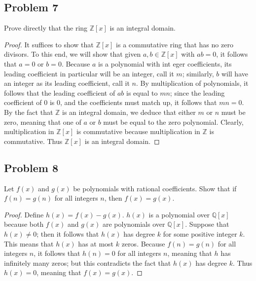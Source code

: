 \documentclass{article}
\begin{document}
\subsection*{Problem 7}
Prove directly that the ring $\mathbb{Z}[x]$ is an integral domain. 
\begin{proof}
	It suffices to show that $\mathbb{Z}[x]$ is a commutative ring that has no 
	zero divisors. To this end, we will show that given $a, b \in \mathbb{Z}[x]$ with
	$ab = 0$, it follows that $a = 0$ or $b = 0$. Because $a$ is a polynomial with int
	eger coefficients, its leading coefficient in particular will be an integer, call
	it $m$; similarly, $b$ will have an integer as its leading coefficient, call it
	$n$. By multiplication of polynomials, it follows that the leading coefficient of
	$ab$ is equal to $mn$; since the leading coefficient of 0 is 0, and the 
	coefficients must match up, it follows that $mn = 0$. By the fact that 
	$\mathbb{Z}$ is an integral domain, we deduce that either $m$ or $n$ must be 
	zero, meaning that one of $a$ or $b$ must be equal to the zero polynomial. 
	Clearly, multiplication in $\mathbb{Z}[x]$ is commutative because multiplication 
	in $\mathbb{Z}$ is commutative. Thus $\mathbb{Z}[x]$ is an integral domain. 
\end{proof}

\subsection*{Problem 8}
Let $f(x)$ and $g(x)$ be polynomials with rational coefficients. Show
that if $f(n) = g(n)$ for all integers $n$, then $f(x) = g(x)$.
\begin{proof}
	Define $h(x) = f(x) - g(x)$. $h(x)$ is a polynomial over $\mathbb{Q}[x]$ because
	both $f(x)$ and $g(x)$ are polynomials over $\mathbb{Q}[x]$. Suppose that 
	$h(x) \neq 0$; then it follows that $h(x)$ has degree $k$ for some positive
	integer $k$. This means that $h(x)$ has at most $k$ zeros. Because $f(n) = g(n)$ 
	for all integers $n$, it follows that $h(n) = 0$ for all integers $n$, meaning 
	that $h$ has infinitely many zeros; but	this contradicts the fact that $h(x)$ 
	has degree $k$. Thus $h(x) = 0$, meaning that $f(x) = g(x)$.
\end{proof}
\end{document}
